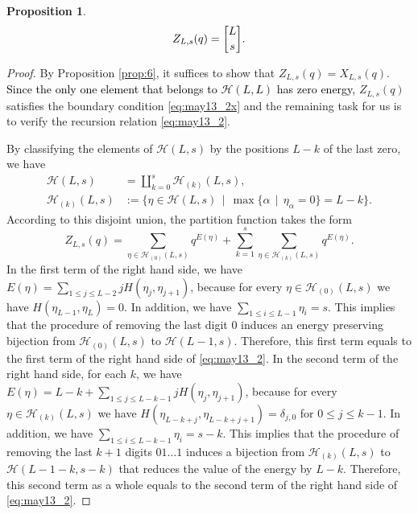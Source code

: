 \documentclass[sn-mathphys-num]{sn-jnl}%
\newcommand{\red}[1]{\textcolor{black}{#1}}
\theoremstyle{thmstyleone}%
\newtheorem{proposition}[theorem]{Proposition}%
\theoremstyle{thmstyletwo}%
\theoremstyle{thmstylethree}%
\begin{document}
\begin{proposition}\label{prop:2024nov27_1}
\begin{equation}
Z_{L,s}(q)  =
{ L \brack s }. \label{eq:2024july3_5}\\
\end{equation}
\end{proposition}
\begin{proof}
By Proposition \ref{prop:6}, it suffices to show that $Z_{L,s}(q)  =X_{L,s}(q)$.
\red{Since the only one element that belongs to $\mathcal{H} (L,L)$ %
has zero energy, }
$Z_{L,s}(q)$ satisfies the boundary condition \eqref{eq:may13_2x}
and the remaining task for us is to verify the recursion relation \eqref{eq:may13_2}.

By classifying the elements of $\mathcal{H} (L,s)$ by the positions $L-k$ of the last zero, we have
\begin{align*}
\mathcal{H} (L,s) &= \coprod_{k = 0}^s \mathcal{H}_{(k)} (L,s),\\
\mathcal{H}_{(k)} (L,s) &:= \{ \eta \in \mathcal{H} (L,s) \, \mid \, 
\max \{ \alpha \, \mid \, \eta_\alpha=0 \} = L-k \}. 
\end{align*}
According to this disjoint union, the partition function takes the form
\begin{equation*}
Z_{L,s}(q) =
\sum_{\eta \in \mathcal{H}_{(0)}  (L,s)} q^{E(\eta)} +
\sum_{k=1}^s \sum_{\eta \in \mathcal{H}_{(k)}  (L,s)} q^{E(\eta)}.
\end{equation*}
In the first term of the right hand side,
we have 
$E(\eta) =\sum_{1 \leq j \leq L-2} j H(\eta_j, \eta_{j+1})$, because for every
$\eta \in \mathcal{H}_{(0)}  (L,s)$ we have
$H(\eta_{L-1},\eta_L) =0$.
In addition, we have $\sum_{1 \leq i \leq L-1}\eta_i = s$.
This implies that the procedure of removing the last digit $0$ induces an energy preserving
bijection from 
$\mathcal{H}_{(0)}  (L,s)$ to $\mathcal{H}  (L-1,s)$.
Therefore, this first term equals to the first term of the right hand side of \eqref{eq:may13_2}.
In the second term of the right hand side, for each $k$,
we have 
$E(\eta) = L-k + \sum_{1 \leq j \leq L-k-1} j H(\eta_j, \eta_{j+1})$, because for every
$\eta \in \mathcal{H}_{(k)}  (L,s)$ we have
$H(\eta_{L-k+j},\eta_{L-k+j+1}) =\delta_{j,0}$ for $0 \leq j \leq k-1$.
In addition, we have $\sum_{1 \leq i \leq L-k-1}\eta_i = s-k$.
This implies that the procedure of removing the last $k+1$ digits $01\dots1$
induces a bijection from 
$\mathcal{H}_{(k)}  (L,s)$ to $\mathcal{H}  (L-1-k,s-k)$ that reduces 
the value of the energy by $L-k$.
Therefore, this second term as a whole 
equals to the second term of the right hand side of \eqref{eq:may13_2}.
\end{proof}
\end{document}
